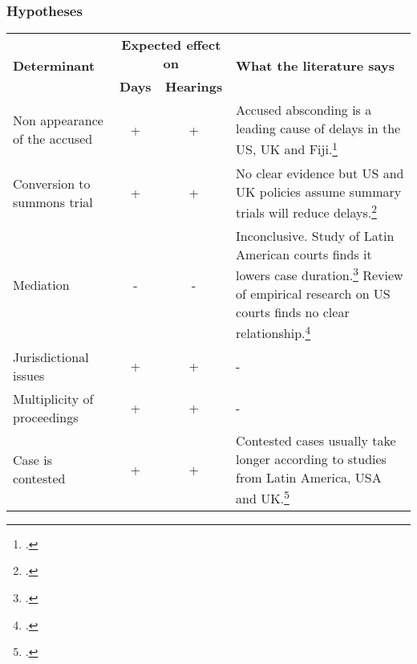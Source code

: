 \documentclass[10pt,aspectratio=169]{beamer}
\begin{document}
\begin{frame}
  \frametitle{Hypotheses}
{  \footnotesize
  \begin{longtable}{@{}p{4cm}ccp{7cm}@{}}
    \toprule
    \multirow{2}{*}{\textbf{Determinant}} & \multicolumn{2}{c}{\textbf{Expected effect on}} & \multirow{2}{*}{\textbf{What the literature says}}\\
    \cmidrule{2-3}
                                          & \textbf{Days} & \textbf{Hearings}\\
    \midrule
    Non appearance of the accused & + & + & Accused absconding is a leading cause of delays in the US, UK and Fiji.\footcites{ostrom2000efficiency}{crownProsecutionService2006_magistrateCourtEfficiency}{llangasinghe1988_fijiJudicialDelays}\\
    Conversion to summons trial & + & + & No clear evidence but US and UK policies assume summary trials will reduce delays.\footcite{miller2003}\\
    Mediation & - & - & Inconclusive. Study of Latin American courts finds it lowers case duration.\footcite{buscaglia1997_latinAmericaCourtDelays} Review of empirical research on US courts finds no clear relationship.\footcite{wissler2004effectiveness}\\
    Jurisdictional issues & + & + & - \\
    Multiplicity of proceedings & + & + & -\\
    Case is contested & + & + & Contested cases usually take longer according to studies from Latin America, USA and UK.\footcites{crownProsecutionService2006_magistrateCourtEfficiency}{buscaglia1997_latinAmericaCourtDelays}{ostrom2000efficiency}\\
    \bottomrule
  \end{longtable}
}\end{frame}
\end{document}

